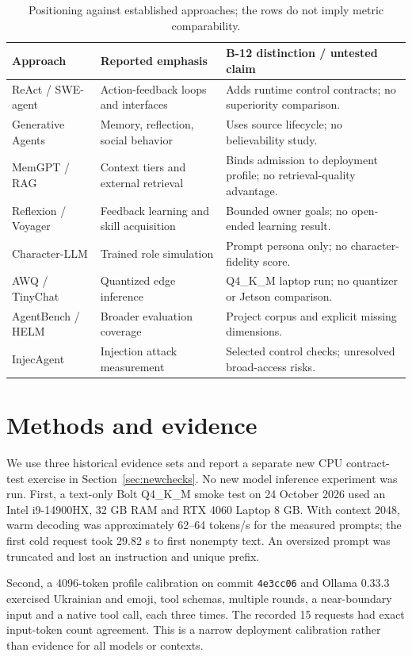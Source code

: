 \documentclass[11pt]{article}
\begin{document}
\begin{table}[ht]\small
\begin{tabularx}{\linewidth}{p{.18\linewidth}YY}\toprule
Approach & Reported emphasis & B-12 distinction / untested claim\\\midrule
ReAct / SWE-agent & Action-feedback loops and interfaces & Adds runtime control contracts; no superiority comparison.\\
Generative Agents & Memory, reflection, social behavior & Uses source lifecycle; no believability study.\\
MemGPT / RAG & Context tiers and external retrieval & Binds admission to deployment profile; no retrieval-quality advantage.\\
Reflexion / Voyager & Feedback learning and skill acquisition & Bounded owner goals; no open-ended learning result.\\
Character-LLM & Trained role simulation & Prompt persona only; no character-fidelity score.\\
AWQ / TinyChat & Quantized edge inference & Q4\_K\_M laptop run; no quantizer or Jetson comparison.\\
AgentBench / HELM & Broader evaluation coverage & Project corpus and explicit missing dimensions.\\
InjecAgent & Injection attack measurement & Selected control checks; unresolved broad-access risks.\\\bottomrule
\end{tabularx}
\caption{Positioning against established approaches; the rows do not imply metric comparability.}\label{tab:related}\end{table}

\section{Methods and evidence}
We use three historical evidence sets and report a separate new CPU contract-test exercise in Section~\ref{sec:newchecks}. No new model inference experiment was run. First, a text-only Bolt Q4\_K\_M smoke test on 24 October 2026 used an Intel i9-14900HX, 32 GB RAM and RTX 4060 Laptop 8 GB. With context 2048, warm decoding was approximately 62--64 tokens/s for the measured prompts; the first cold request took 29.82 s to first nonempty text. An oversized prompt was truncated and lost an instruction and unique prefix.

Second, a 4096-token profile calibration on commit \texttt{4e3cc06} and Ollama 0.33.3 exercised Ukrainian and emoji, tool schemas, multiple rounds, a near-boundary input and a native tool call, each three times. The recorded 15 requests had exact input-token count agreement. This is a narrow deployment calibration rather than evidence for all models or contexts.
\end{document}
